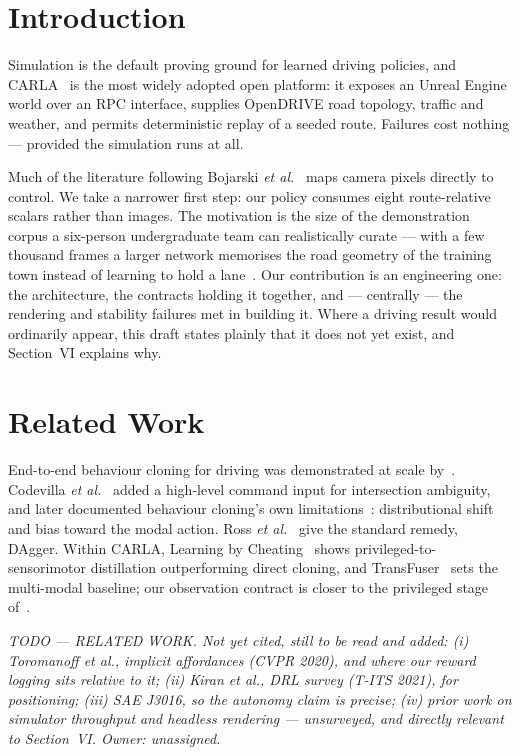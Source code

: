 \documentclass[conference]{IEEEtran}
\newcommand{\TODO}[1]{%
  \begingroup
  \setlength{\FrameSep}{4pt}%
  \def\FrameCommand{{\color{gray!55}\vrule width 1.2pt}\hspace{5pt}}%
  \MakeFramed{\advance\hsize-\width \FrameRestore}%
  \noindent\scriptsize\itshape\color{gray!80}#1%
  \endMakeFramed
  \endgroup}
\begin{document}
\section{Introduction}

Simulation is the default proving ground for learned driving policies,
and CARLA~\cite{carla} is the most widely adopted open platform: it
exposes an Unreal Engine world over an RPC interface, supplies OpenDRIVE
road topology, traffic and weather, and permits deterministic replay of
a seeded route. Failures cost nothing --- provided the simulation runs
at all.

Much of the literature following Bojarski \textit{et al.}~\cite{bojarski}
maps camera pixels directly to control. We take a narrower first step:
our policy consumes eight route-relative scalars rather than images. The
motivation is the size of the demonstration corpus a six-person
undergraduate team can realistically curate --- with a few thousand
frames a larger network memorises the road geometry of the training town
instead of learning to hold a lane~\cite{limits}. Our contribution is an
engineering one: the architecture, the contracts holding it together,
and --- centrally --- the rendering and stability failures met in
building it. Where a driving result would ordinarily appear, this draft
states plainly that it does not yet exist, and Section~VI explains why.

\section{Related Work}

End-to-end behaviour cloning for driving was demonstrated at scale
by~\cite{bojarski}. Codevilla \textit{et al.}~\cite{cil} added a
high-level command input for intersection ambiguity, and later
documented behaviour cloning's own limitations~\cite{limits}:
distributional shift and bias toward the modal action. Ross \textit{et
al.}~\cite{dagger} give the standard remedy, DAgger. Within CARLA,
Learning by Cheating~\cite{lbc} shows privileged-to-sensorimotor
distillation outperforming direct cloning, and
TransFuser~\cite{transfuser} sets the multi-modal baseline; our
observation contract is closer to the privileged stage of~\cite{lbc}.

\TODO{TODO --- RELATED WORK. Not yet cited, still to be read and added:
(i) Toromanoff \textit{et al.}, implicit affordances (CVPR 2020), and
where our reward logging sits relative to it; (ii) Kiran \textit{et
al.}, DRL survey (T-ITS 2021), for positioning; (iii) SAE J3016, so the
autonomy claim is precise; (iv) prior work on simulator throughput and
headless rendering --- unsurveyed, and directly relevant to Section~VI.
Owner: unassigned.}
\end{document}
